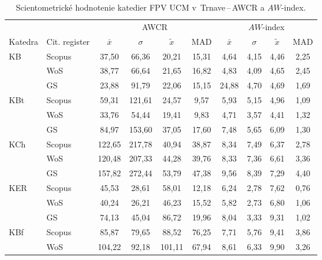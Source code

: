 \begin{table}
  \centering\small
  \caption[Hodnotenie FPV\,--\,AWCR a $AW$-index]%
  {Scientometrické hodnotenie katedier FPV UCM v~Trnave\,--\,AWCR a $AW$-index.}
  \label{tab:5-staff.results}
  \begin{tabularx}{\textwidth}{Xlcccc@{\hspace{3ex}}cccc}
    \toprule\noalign{\vspace{.3ex}}
    & & \multicolumn{4}{c}{AWCR}         & \multicolumn{4}{c}{$AW$-index}  \\
    \cmidrule{3-6}\cmidrule{7-10}
    Katedra & Cit. register & $\bar{x}$ & $\sigma$ & $\tilde{x}$ & MAD & $\bar{x}$ & $\sigma$ & $\tilde{x}$ & MAD \\[0.3ex]
    \midrule\noalign{\vspace{.5ex}}
    KB   & Scopus & 37,50  & 66,36  & 20,21  & 15,31  & 4,64  & 4,15 & 4,46  & 2,25 \\
         & WoS    & 38,77  & 66,64  & 21,65  & 16,82  & 4,83  & 4,09 & 4,65  & 2,45 \\
         & GS     & 23,88  & 91,79  & 22,06  & 15,15  & 24,88 & 4,70 & 4,69  & 1,69 \\[3ex]
    KBt  & Scopus & 59,31  & 121,61 & 24,57  & 9,57   & 5,93  & 5,15 & 4,96  & 1,09 \\
         & WoS    & 33,76  & 54,44  & 19,41  & 9,83   & 4,71  & 3,57 & 4,41  & 1,32 \\
         & GS     & 84,97  & 153,60 & 37,05  & 17,60  & 7,48  & 5,65 & 6,09  & 1,30 \\[3ex]
    KCh  & Scopus & 122,65 & 217,78 & 40,94  & 38,87  & 8,34  & 7,49 & 6,37  & 2,78 \\
         & WoS    & 120,48 & 207,33 & 44,28  & 39,76  & 8,33  & 7,36 & 6,61  & 3,36 \\
         & GS     & 157,82 & 272,44 & 53,79  & 47,38  & 9,56  & 8,39 & 7,29  & 4,40 \\[3ex]
    KER  & Scopus & 45,53  & 28,61  & 58,01  & 12,18  & 6,24  & 2,78 & 7,62  & 0,76 \\
         & WoS    & 40,24  & 26,21  & 46,23  & 15,52  & 5,82  & 2,73 & 6,80  & 1,06 \\
         & GS     & 74,13  & 45,04  & 86,72  & 19,96  & 8,04  & 3,33 & 9,31  & 1,02 \\[3ex]
    KBf  & Scopus & 85,87  & 79,65  & 88,52  & 76,25  & 7,71  & 5,76 & 9,41  & 3,86 \\
         & WoS    & 104,22 & 92,18  & 101,11 & 67,94  & 8,61  & 6,33 & 9,90  & 3,26 \\

\end{tabularx}
\end{table}
